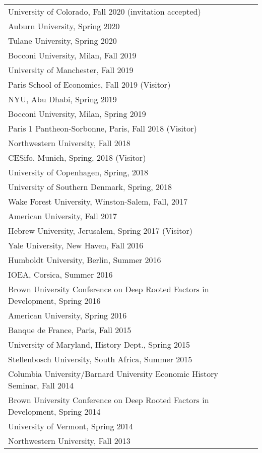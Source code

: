 \documentclass[11pt,fullpage]{article}
\begin{document}
\begin{tabular}{ll}
	University of Colorado, Fall 2020 (invitation accepted) \\
	Auburn University, Spring 2020 \\
	Tulane University, Spring 2020 \\
	Bocconi University, Milan, Fall 2019 \\
	University of Manchester, Fall 2019 \\
	Paris School of Economics, Fall 2019 (Visitor) \\
	NYU, Abu Dhabi, Spring 2019 \\
	Bocconi University, Milan, Spring 2019  \\
	Paris 1 Pantheon-Sorbonne, Paris, Fall 2018 (Visitor) \\
	Northwestern University, Fall 2018 \\
	CESifo, Munich, Spring, 2018 (Visitor) \\
	University of Copenhagen, Spring, 2018 \\
	University of Southern Denmark, Spring, 2018 \\
	Wake Forest University, Winston-Salem, Fall, 2017 \\
	American University, Fall 2017 \\
	Hebrew University, Jerusalem, Spring 2017 (Visitor) \\
	Yale University, New Haven, Fall 2016\\
	Humboldt University, Berlin, Summer 2016\\
	IOEA, Corsica, Summer 2016\\
	Brown University Conference on Deep Rooted Factors in Development, Spring 2016 \\
	American University, Spring 2016 \\
	Banque de France, Paris, Fall 2015 \\
	University of Maryland, History Dept., Spring 2015 \\
	Stellenbosch University, South Africa, Summer 2015 \\
	Columbia University/Barnard University Economic History Seminar, Fall 2014\\
	Brown University Conference on Deep Rooted Factors in Development, Spring 2014\\
	University of Vermont, Spring 2014\\
	Northwestern University, Fall 2013 \\

\end{tabular}
\end{document}
